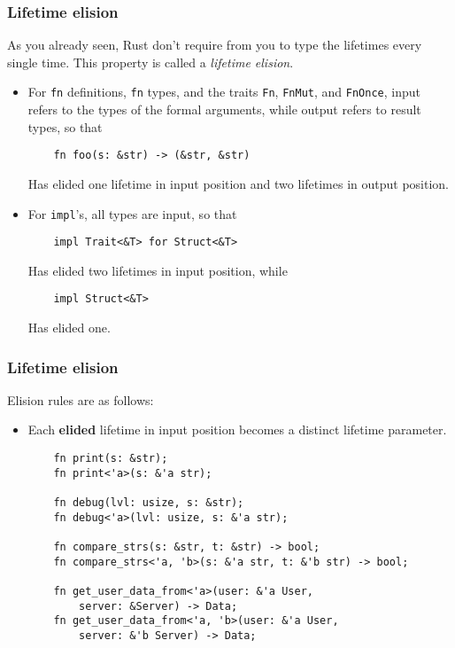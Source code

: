 \documentclass[aspectratio=1610,t]{beamer}
\begin{document}

\begin{frame}[fragile]
\frametitle{Lifetime elision}
As you already seen, Rust don't require from you to type the lifetimes every single time. This property is called a \textit{lifetime elision}.


\begin{itemize}
    \item<3-> For \texttt{fn} definitions, \texttt{fn} types, and the traits \texttt{Fn}, \texttt{FnMut}, and \texttt{FnOnce}, input refers to the types of the formal arguments, while output refers to result types, so that
    
    \begin{verbatim}
    fn foo(s: &str) -> (&str, &str)
    \end{verbatim}

    Has elided one lifetime in input position and two lifetimes in output position.

    \item<4-> For \texttt{impl}'s, all types are input, so that
    
    \begin{verbatim}
    impl Trait<&T> for Struct<&T>
    \end{verbatim}

    Has elided two lifetimes in input position, while
    
    \begin{verbatim}
    impl Struct<&T>
    \end{verbatim}
    
    Has elided one.
\end{itemize}
\end{frame}


\begin{frame}[fragile]
\frametitle{Lifetime elision}
Elision rules are as follows:

\begin{itemize}
    \item Each \textbf{elided} lifetime in input position becomes a distinct lifetime parameter.
    
    \begin{verbatim}
    fn print(s: &str);
    fn print<'a>(s: &'a str);

    fn debug(lvl: usize, s: &str);
    fn debug<'a>(lvl: usize, s: &'a str);

    fn compare_strs(s: &str, t: &str) -> bool;
    fn compare_strs<'a, 'b>(s: &'a str, t: &'b str) -> bool;

    fn get_user_data_from<'a>(user: &'a User,
        server: &Server) -> Data;
    fn get_user_data_from<'a, 'b>(user: &'a User,
        server: &'b Server) -> Data;
    \end{verbatim}
\end{itemize}
\end{frame}
\end{document}
